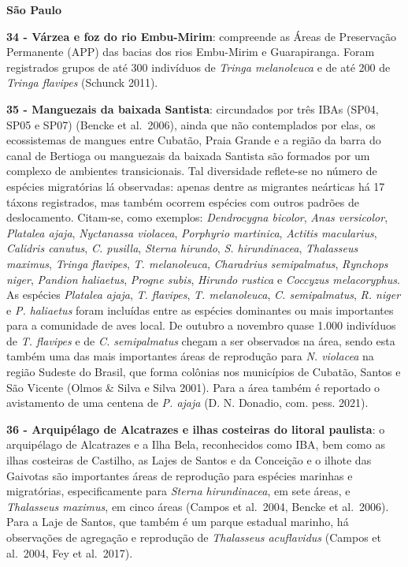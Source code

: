 \documentclass[
  oneside]{scrbook}
\begin{document}
\textbf{São Paulo}

\textbf{34 - Várzea e foz do rio Embu-Mirim}: compreende as Áreas de Preservação Permanente (APP) das bacias dos rios Embu-Mirim e Guarapiranga. Foram registrados grupos de até 300 indivíduos de \emph{Tringa melanoleuca} e de até 200 de \emph{Tringa flavipes} (Schunck 2011).

\textbf{35 - Manguezais da baixada Santista}: circundados por três IBAs (SP04, SP05 e SP07) (Bencke et al.~2006), ainda que não contemplados por elas, os ecossistemas de mangues entre Cubatão, Praia Grande e a região da barra do canal de Bertioga ou manguezais da baixada Santista são formados por um complexo de ambientes transicionais. Tal diversidade reflete-se no número de espécies migratórias lá observadas: apenas dentre as migrantes neárticas há 17 táxons registrados, mas também ocorrem espécies com outros padrões de deslocamento. Citam-se, como exemplos: \emph{Dendrocygna bicolor}, \emph{Anas versicolor}, \emph{Platalea ajaja}, \emph{Nyctanassa violacea}, \emph{Porphyrio martinica}, \emph{Actitis macularius}, \emph{Calidris canutus}, \emph{C. pusilla}, \emph{Sterna hirundo}, \emph{S. hirundinacea}, \emph{Thalasseus maximus}, \emph{Tringa flavipes}, \emph{T. melanoleuca}, \emph{Charadrius semipalmatus}, \emph{Rynchops niger}, \emph{Pandion haliaetus}, \emph{Progne subis}, \emph{Hirundo rustica} e \emph{Coccyzus melacoryphus}. As espécies \emph{Platalea ajaja}, \emph{T. flavipes}, \emph{T. melanoleuca}, \emph{C. semipalmatus}, \emph{R. niger} e \emph{P. haliaetus} foram incluídas entre as espécies dominantes ou mais importantes para a comunidade de aves local. De outubro a novembro quase 1.000 indivíduos de \emph{T. flavipes} e de \emph{C. semipalmatus} chegam a ser observados na área, sendo esta também uma das mais importantes áreas de reprodução para \emph{N. violacea} na região Sudeste do Brasil, que forma colônias nos municípios de Cubatão, Santos e São Vicente (Olmos \& Silva e Silva 2001). Para a área também é reportado o avistamento de uma centena de \emph{P. ajaja} (D. N. Donadio, com. pess. 2021).

\textbf{36 - Arquipélago de Alcatrazes e ilhas costeiras do litoral paulista}: o arquipélago de Alcatrazes e a Ilha Bela, reconhecidos como IBA, bem como as ilhas costeiras de Castilho, as Lajes de Santos e da Conceição e o ilhote das Gaivotas são importantes áreas de reprodução para espécies marinhas e migratórias, especificamente para \emph{Sterna hirundinacea}, em sete áreas, e \emph{Thalasseus maximus}, em cinco áreas (Campos et al.~2004, Bencke et al.~2006). Para a Laje de Santos, que também é um parque estadual marinho, há observações de agregação e reprodução de \emph{Thalasseus acuflavidus} (Campos et al.~2004, Fey et al.~2017).
\end{document}
